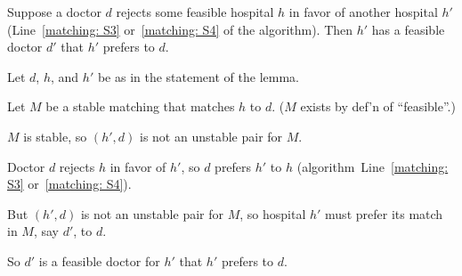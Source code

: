 \documentclass[11pt]{article}
\begin{document}
\begin{lemma}\label{matching: lemma: not best}
  Suppose a doctor $d$ rejects some feasible hospital $h$ in favor of another hospital $h'$ (Line~\ref{matching: S3} or~\ref{matching: S4} of the algorithm).
  Then $h'$ has a feasible doctor $d'$ that $h'$ prefers to $d$.
\end{lemma}
\begin{longFormProof}
  \step Let $d$, $h$, and $h'$ be as in the statement of the lemma.  

  \step Let $M$ be a stable matching that matches $h$ to $d$.  ($M$ exists by def'n of ``feasible''.)
  
  \step $M$ is stable, so $(h', d)$ is not an unstable pair for $M$.
  
  \step Doctor $d$ rejects $h$ in favor of $h'$, so $d$ prefers $h'$ to $h$ (algorithm~Line~\ref{matching: S3} or~\ref{matching: S4}).

  \step But $(h', d)$ is not an unstable pair for $M$, so hospital $h'$ must prefer its match in $M$, say $d'$, to $d$.

  \step So $d'$ is a feasible doctor for $h'$ that $h'$ prefers to $d$. 
\end{longFormProof}
\end{document}
